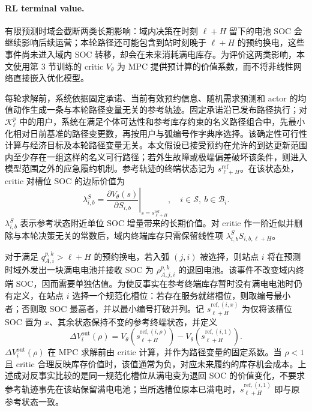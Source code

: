\documentclass[12pt,a4paper,UTF8]{ctexart}
\begin{document}
\paragraph{RL terminal value.}
有限预测时域会截断两类长期影响：域内决策在时刻 $\ell+H$ 留下的电池 SOC 会继续影响后续运营；本轮路径还可能包含到站时刻晚于 $\ell+H$ 的预约换电，这些事件尚未进入域内 SOC 转移，却会在未来消耗满电库存。为评价这两类影响，本文使用第 3 节训练的 critic $V_\theta$ 为 MPC 提供预计算的价值系数，而不将非线性网络直接嵌入优化模型。

每轮求解前，系统依据固定承诺、当前有效预约信息、随机需求预测和 actor 的均值动作生成一条与本轮路径变量无关的参考轨迹。固定承诺沿已发布路径执行；对 $\mathcal K_\ell^p$ 中的用户，系统在满足个体可达性和参考库存约束的名义路径组合中，先最小化相对日前基准的路径变更数，再按用户与弧编号作字典序选择。该确定性可行性计算与经济目标及本轮路径变量无关。本文假设已接受预约在允许的到达更新范围内至少存在一组这样的名义可行路径；若外生故障或极端偏差破坏该条件，则进入模型范围之外的应急履约机制。参考轨迹的终端状态记为 $s_{\ell+H}^{\mathrm{ref}}$。在该状态处，critic 对槽位 SOC 的边际价值为
\begin{equation}
\lambda^S_{i,b}
=
\left.
\frac{\partial V_{\theta}(s)}
{\partial S_{i,b}}
\right|_{s=s_{\ell+H}^{\mathrm{ref}}},
\quad i\in\mathcal S,\ b\in\mathcal B_i.
\label{eq:marginal_value_soc}
\end{equation}
$\lambda^S_{i,b}$ 表示参考状态附近单位 SOC 增量带来的长期价值。对 critic 作一阶近似并删除与本轮决策无关的常数后，域内终端库存只需保留线性项 $\lambda^S_{i,b}S_{i,b,\ell+H}$。

对于满足 $q_{A,i}^{p,k}>\ell+H$ 的预约换电，若入弧 $(j,i)$ 被选择，则站点 $i$ 将在预测时域外发出一块满电电池并接收 SOC 为 $\rho_{A,j,i}^{p,k}$ 的退回电池。该事件不改变域内终端 SOC，因而需要单独估值。为使反事实在参考终端库存暂时没有满电电池时仍有定义，在站点 $i$ 选择一个规范化槽位：若存在服务就绪槽位，则取编号最小者；否则取 SOC 最高者，并以最小编号打破并列。记 $s_{\ell+H}^{\mathrm{ref},(i,x)}$ 为仅将该槽位 SOC 置为 $x$、其余状态保持不变的参考终端状态，并定义
\begin{equation}
\Delta V_{i}^{\mathrm{out}}(\rho)
=
 V_\theta\!\left(s_{\ell+H}^{\mathrm{ref},(i,\rho)}\right)
-V_\theta\!\left(s_{\ell+H}^{\mathrm{ref},(i,1)}\right).
\label{eq:outside_swap_value}
\end{equation}
$\Delta V_{i}^{\mathrm{out}}(\rho)$ 在 MPC 求解前由 critic 计算，并作为路径变量的固定系数。当 $\rho<1$ 且 critic 合理反映库存价值时，该值通常为负，对应未来履约的库存机会成本。上述成对反事实比较的是同一规范化槽位从满电变为退回 SOC 的价值变化，不要求参考轨迹事先在该站保留满电电池；当所选槽位原本已满电时，$s_{\ell+H}^{\mathrm{ref},(i,1)}$ 即与原参考状态一致。
\end{document}
